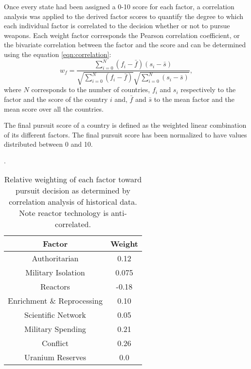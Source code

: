 Once every state had been assigned a 0-10 score for each factor, a correlation
analysis was applied to the derived factor scores to quantify the degree to
which each individual factor is correlated to the decision whether or not to
pursue weapons.
Each weight factor corresponds the Pearson correlation coefficient, or
the bivariate correlation between the factor and the score and can be
determined using the equation \ref{eqn:correlation}:
\begin{equation}
    \label{eqn:correlation}
    w_{f} = \frac{\sum_{i=0}^{N} (f_{i} - \bar{f}) (s_{i} - \bar{s})}
                 {\sqrt{\sum_{i=0}^{N}\left(f_{i} - \bar{f}\right)}
                 \sqrt{\sum_{i=0}^{N}\left(s_{i} - \bar{s}\right)}},
\end{equation}
where $N$ corresponds to the number of countries, $f_{i}$ and $s_{i}$ respectively
to the factor and the score of the country $i$ and, $\bar{f}$ and $\bar{s}$ to
the mean factor and the mean score over all the countries.

The final pursuit score of a country is defined as the weighted linear combination of
its different factors. The final pursuit score has been normalized to have
values distributed between 0 and 10.

.


\begin{table}
\centering
\begin{tabular}{|c|c|}
\hline
\textbf{Factor}        & \textbf{Weight} \\
\hline
Authoritarian   & 0.12 \\
Military Isolation & 0.075 \\
Reactors           & -0.18 \\
Enrichment \& Reprocessing & 0.10 \\
Scientific Network & 0.05 \\
Military Spending & 0.21 \\
Conflict  & 0.26 \\
Uranium Reserves &  0.0 \\
\hline
\end{tabular}
\caption{Relative weighting of each factor toward pursuit decision as determined by correlation analysis of historical data. Note reactor technology is anti-correlated.}
\label{tab:factor_weights}
\end{table}

